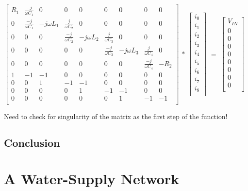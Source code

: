 \documentclass[11pt,a4paper]{article}
\begin{document}
$\begin{bmatrix*}
	R_{1} & \frac{-j}{\omega C_{1}} & 0 & 0 & 0 & 0 & 0 & 0 & 0 \\
	0 & \frac{-j}{\omega C_{1}} & -j \omega L_{1} & \frac{j}{\omega C_{2}} & 0 & 0 & 0 & 0 & 0\\
	0 & 0 &  0 & \frac{-j}{\omega C_{2}} & -j \omega L_{2} & \frac{j}{\omega C_{3}} & 0 & 0 & 0\\
	0 & 0 & 0 & 0 & 0 & \frac{-j}{\omega C_{3}} & -j \omega L_{3} & \frac{j}{\omega C_{4}} & 0\\
	0 & 0 & 0 & 0 & 0 & 0 & 0 & \frac{-j}{\omega C_{4}} & -R_{2}\\
	1 & -1 & -1 & 0 & 0 & 0 & 0 & 0 & 0\\
	0 & 0 & 1 & -1 & -1 & 0 & 0 & 0 & 0\\
	0 & 0 & 0 & 0 & 1 & -1 & -1 & 0 & 0\\
	0 & 0 & 0 & 0 & 0 & 0 & 1 & -1 & -1\\
\end{bmatrix*}$
$ * $
$\begin{bmatrix}
	i_{0}\\
	i_{1}\\
	i_{2}\\
	i_{3}\\
	i_{4}\\
	i_{5}\\
	i_{6}\\
	i_{7}\\
	i_{8}\\
\end{bmatrix}$ 
$ = $
$\begin{bmatrix}
	V_{IN}\\
	0\\
	0\\
	0\\
	0\\
	0\\
	0\\
	0\\
	0\\
\end{bmatrix}$

Need to check for singularity of the matrix as the first step of the function!

\subsection{Conclusion}

\newpage

\section{A Water-Supply Network} \label{sec:pipes}
\end{document}
